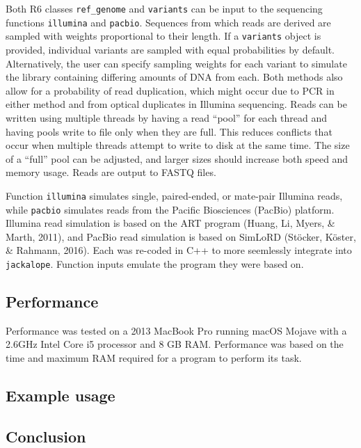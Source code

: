 \documentclass[12pt,]{article}
\begin{document}
Both R6 classes \texttt{ref\_genome} and \texttt{variants} can be input to the sequencing functions
\texttt{illumina} and \texttt{pacbio}.
Sequences from which reads are derived are sampled with weights proportional to
their length.
If a \texttt{variants} object is provided, individual variants are sampled with equal
probabilities by default.
Alternatively, the user can specify sampling weights for each variant
to simulate the library containing differing amounts of DNA from each.
Both methods also allow for a probability of read duplication, which might occur
due to PCR in either method and from optical duplicates in Illumina sequencing.
Reads can be written using multiple threads by having a read ``pool'' for each thread
and having pools write to file only when they are full.
This reduces conflicts that occur when multiple threads attempt to write to disk
at the same time.
The size of a ``full'' pool can be adjusted, and larger sizes should increase both
speed and memory usage.
Reads are output to FASTQ files.

Function \texttt{illumina} simulates single, paired-ended, or mate-pair Illumina reads,
while \texttt{pacbio} simulates reads from the Pacific Biosciences (PacBio) platform.
Illumina read simulation is based on the ART program
(Huang, Li, Myers, \& Marth, 2011), and
PacBio read simulation is based on SimLoRD (Stöcker, Köster, \& Rahmann, 2016).
Each was re-coded in C++ to more seemlessly integrate into \texttt{jackalope}.
Function inputs emulate the program they were based on.

\hypertarget{performance}{%
\subsection{Performance}\label{performance}}

Performance was tested on a 2013 MacBook Pro running macOS Mojave with a
2.6GHz Intel Core i5 processor and 8 GB RAM.
Performance was based on the time and maximum RAM required for a program
to perform its task.

\hypertarget{example-usage}{%
\subsection{Example usage}\label{example-usage}}

\hypertarget{conclusion}{%
\subsection{Conclusion}\label{conclusion}}
\end{document}
